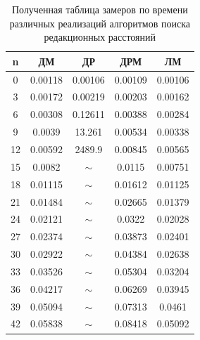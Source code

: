 \begin{table}[!ht]
	\centering
	\label{t:timings}
	\caption{Полученная таблица замеров по времени различных реализаций алгоритмов поиска редакционных расстояний}
	\begin{tabular}{|c|c|c|c|c|}
		\hline
		n  & ДМ & ДР & ДРМ & ЛМ \\
  \hline
	0  & 0.00118            & 0.00106               & 0.00109                     & 0.00106                \\  \hline
	3  & 0.00172            & 0.00219               & 0.00203                     & 0.00162                \\ \hline
	6  & 0.00308            & 0.12611               & 0.00388                     & 0.00284                \\ \hline
	9  & 0.0039             & 13.261                & 0.00534                     & 0.00338                \\ \hline
	12 & 0.00592            & 2489.9                & 0.00845                     & 0.00565                \\ \hline
	15 & 0.0082             & $\sim$                & 0.0115                      & 0.00751                \\ \hline
	18 & 0.01115            & $\sim$                & 0.01612                     & 0.01125                \\ \hline
	21 & 0.01484            & $\sim$                & 0.02665                     & 0.01379                \\ \hline
	24 & 0.02121            & $\sim$                & 0.0322                      & 0.02028                \\ \hline
	27 & 0.02374            & $\sim$                & 0.03873                     & 0.02401                \\ \hline
	30 & 0.02922            & $\sim$                & 0.04384                     & 0.02638                \\ \hline
	33 & 0.03526            & $\sim$                & 0.05304                     & 0.03204                \\ \hline
	36 & 0.04217            & $\sim$                & 0.06269                     & 0.03945                \\ \hline
	39 & 0.05094            & $\sim$                & 0.07313                     & 0.0461                 \\ \hline
	42 & 0.05838            & $\sim$                & 0.08418                     & 0.05092                \\ \hline

\end{tabular}
\end{table}
